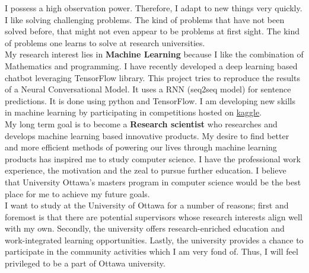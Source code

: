 \documentclass{article}
\begin{document}
I possess a high observation power. Therefore, I adapt to new things very quickly. I like solving challenging problems. The kind of problems that have not been solved before, that might not even appear to be problems at first sight. The kind of problems one learns to solve at research universities.\\

My research interest lies in \textbf{Machine Learning} because I like the combination of Mathematics and programming. I have recently developed a deep learning based chatbot leveraging TensorFlow library. This project tries to reproduce the results of a Neural Conversational Model. It uses a RNN (seq2seq model) for sentence predictions. It is done using python and TensorFlow. I am developing new skills in machine learning by participating in competitions hosted on \href{https://www.kaggle.com/}{kaggle}.\\

My long term goal is to become a \textbf{Research scientist} who researches and develops machine learning based innovative products. My desire to find better and more efficient methods of powering our lives through machine learning products has inspired me to study computer science. I have the professional work experience, the motivation and the zeal to pursue further education. I believe that University Ottawa’s masters program in computer science would be the best place for me to achieve my future goals.\\

I want to study at the University of Ottawa for a number of reasons; first and foremost is that there are potential supervisors whose research interests align well with my own. Secondly, the university offers research-enriched education and work-integrated learning opportunities. Lastly, the university provides a chance to participate in the community activities which I am very fond of. Thus, I will feel privileged to be a part of Ottawa university.

  
\end{document}
